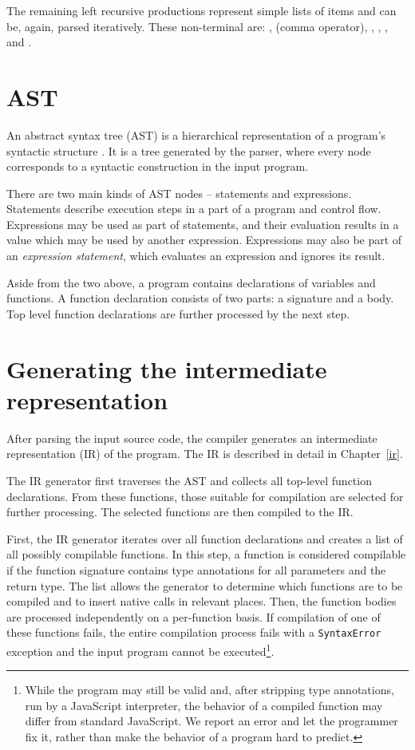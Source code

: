 The remaining left recursive productions represent simple lists of items and can be, again, parsed iteratively. These non-terminal are: \nonterminal[FormalParameters]{}{}, \nonterminal[Expression]{}{} (comma operator), \nonterminal[LexicalDeclaration]{}{}, \nonterminal[VariableDeclaration]{}{}, \nonterminal[Arguments]{}{}, and \nonterminal[StatementList]{}{}.


\section{AST}

An abstract syntax tree (AST) is a hierarchical representation of a program's syntactic structure \cite{dragon}. It is a tree generated by the parser, where every node corresponds to a syntactic construction in the input program.

There are two main kinds of AST nodes -- statements and expressions. Statements describe execution steps in a part of a program and control flow. Expressions may be used as part of statements, and their evaluation results in a value which may be used by another expression. Expressions may also be part of an \textit{expression statement}, which evaluates an expression and ignores its result.

Aside from the two above, a program contains declarations of variables and functions. A function declaration consists of two parts: a signature and a body. Top level function declarations are further processed by the next step.


\section{Generating the intermediate representation}

After parsing the input source code, the compiler generates an intermediate representation (IR) of the program. The IR is described in detail in Chapter~\ref{ir}.

The IR generator first traverses the AST and collects all top-level function declarations. From these functions, those suitable for compilation are selected for further processing. The selected functions are then compiled to the IR.

First, the IR generator iterates over all function declarations and creates a list of all possibly compilable functions. In this step, a function is considered compilable if the function signature contains type annotations for all parameters and the return type. The list allows the generator to determine which functions are to be compiled and to insert native calls in relevant places. Then, the function bodies are processed independently on a per-function basis. If compilation of one of these functions fails, the entire compilation process fails with a \texttt{SyntaxError} exception and the input program cannot be executed\footnote{While the program may still be valid and, after stripping type annotations, run by a JavaScript interpreter, the behavior of a compiled function may differ from standard JavaScript. We report an error and let the programmer fix it, rather than make the behavior of a program hard to predict.}.

